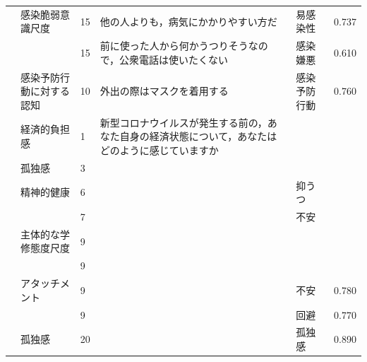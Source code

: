 \begin{landscape}
\begin{longtable}{p{2cm}p{2cm}p{2cm}p{6cm}p{2cm}p{2cm}}
		                         & 感染脆弱意識尺度                         & 15  & 他の人よりも，病気にかかりやすい方だ                                  & 易感染性                 & 0.737      \\
		                         &                                  & 15  & 前に使った人から何かうつりそうなので，公衆電話は使いたくない                      & 感染嫌悪                 & 0.610      \\
		                         & 感染予防行動に対する認知                     & 10  & 外出の際はマスクを着用する                                       & 感染予防行動               & 0.760      \\
		\textcite{Iida202192}       & 経済的負担感                           & 1   & 新型コロナウイルスが発生する前の，あなた自身の経済状態について，あなたはどのように感じていますか    &                      &            \\
		                         & 孤独感                              & 3   &                                                     &                      &            \\
		                         & 精神的健康                            & 6   &                                                     & 抑うつ                  &            \\
		                         &                                  & 7   &                                                     & 不安                   &            \\
		\textcite{Nagai202192}      & 主体的な学修態度尺度                       & 9   &                                                     &                      &            \\
		                         &                                  & 9   &                                                     &                      &            \\
		\textcite{Nakao202192}      & アタッチメント                          & 9   &                                                     & 不安                   & 0.780      \\
		                         &                                  & 9   &                                                     & 回避                   & 0.770      \\
		                         & 孤独感                              & 20  &                                                     & 孤独感                  & 0.890      \\

\end{longtable}
\end{landscape}
